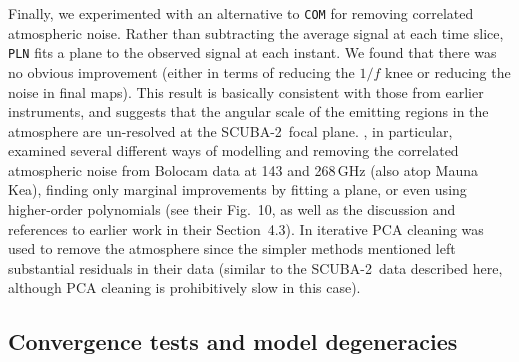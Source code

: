 \documentclass[useAMS,usenatbib,nofootinbib]{mn2e}
\newcommand{\scuba}{SCUBA-2}
\newcommand{\model}[1]{\texttt{#1}}
\begin{document}
Finally, we experimented with an alternative to \model{COM} for
removing correlated atmospheric noise. Rather than subtracting the
average signal at each time slice, \model{PLN} fits a plane to the
observed signal at each instant. We found that there was no obvious
improvement (either in terms of reducing the $1/f$ knee or reducing
the noise in final maps). This result is basically consistent with
those from earlier instruments, and suggests that the angular scale of
the emitting regions in the atmosphere are un-resolved at the \scuba\
focal plane. \citet{sayers2010}, in particular, examined several
different ways of modelling and removing the correlated atmospheric
noise from Bolocam data at 143 and 268\,GHz (also atop Mauna Kea),
finding only marginal improvements by fitting a plane, or even using
higher-order polynomials (see their Fig.~10, as well as the discussion
and references to earlier work in their Section~4.3). In
\citet{aguirre2011} iterative PCA cleaning was used to remove the
atmosphere since the simpler methods mentioned left substantial
residuals in their data (similar to the \scuba\ data described here,
although PCA cleaning is prohibitively slow in this case).

\subsection{Convergence tests and model degeneracies}
\label{sec:converge}
\end{document}
